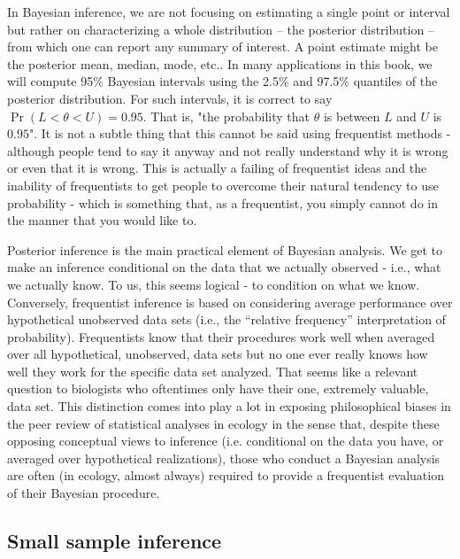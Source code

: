 In Bayesian inference, we are not focusing on estimating a single
point or interval but rather on characterizing a whole distribution --
the posterior distribution -- from which one can report any summary of
interest. A point estimate might be the posterior mean, median, mode,
etc..  In many applications in this book, we will compute 95\%
Bayesian intervals using the 2.5\% and 97.5\% quantiles of the
posterior distribution. For such intervals, it is correct to say
$\Pr(L < \theta < U) = 0.95$. That is, "the probability that $\theta$
is between $L$ and $U$ is $0.95$". It is not a subtle thing that this
cannot be said using frequentist methods - although people tend to say
it anyway and not really understand why it is wrong or even that it is
wrong. This is actually a failing of frequentist ideas and the
inability of frequentists to get people to overcome their natural
tendency to use probability - which is something that, as a
frequentist, you simply cannot do in the manner that you would like
to.



Posterior inference is the main practical element of Bayesian
analysis. We get to make an inference conditional on the data that we
actually observed - i.e., what we actually know.  To us, this seems
logical - to condition on what we know. Conversely, frequentist
inference is based on considering average performance over
hypothetical unobserved data sets (i.e., the ``relative frequency''
interpretation of probability).  Frequentists know that their
procedures work well when averaged over all hypothetical, unobserved,
data sets but no one ever really knows how well they work for the
specific data set analyzed. That seems like a relevant question to
biologists who oftentimes only have their one, extremely valuable,
data set.  This distinction comes into play a lot in exposing
philosophical biases in the peer review of statistical analyses in
ecology in the sense that, despite these opposing conceptual views to
inference (i.e. conditional on the data you have, or averaged over
hypothetical realizations), those who conduct a Bayesian analysis are
often (in ecology, almost always) required to provide a frequentist
evaluation of their Bayesian procedure.

\subsection{Small sample inference}

